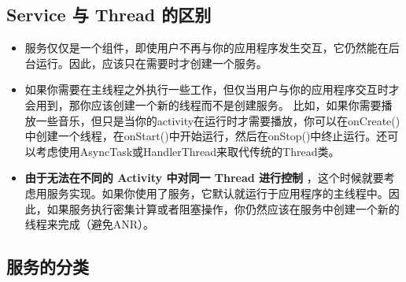 \documentclass[9pt, b5paper]{article}
\begin{document}
\subsection{Service 与 Thread 的区别}
\label{sec-3-2}
\begin{itemize}
\item 服务仅仅是一个组件，即使用户不再与你的应用程序发生交互，它仍然能在后台运行。因此，应该只在需要时才创建一个服务。
\item 如果你需要在主线程之外执行一些工作，但仅当用户与你的应用程序交互时才会用到，那你应该创建一个新的线程而不是创建服务。 比如，如果你需要播放一些音乐，但只是当你的activity在运行时才需要播放，你可以在onCreate()中创建一个线程，在onStart()中开始运行，然后在onStop()中终止运行。还可以考虑使用AsyncTask或HandlerThread来取代传统的Thread类。
\item \textbf{由于无法在不同的 Activity 中对同一 Thread 进行控制} ，这个时候就要考虑用服务实现。如果你使用了服务，它默认就运行于应用程序的主线程中。因此，如果服务执行密集计算或者阻塞操作，你仍然应该在服务中创建一个新的线程来完成（避免ANR）。
\end{itemize}
\subsection{服务的分类}
\label{sec-3-3}
\end{document}
